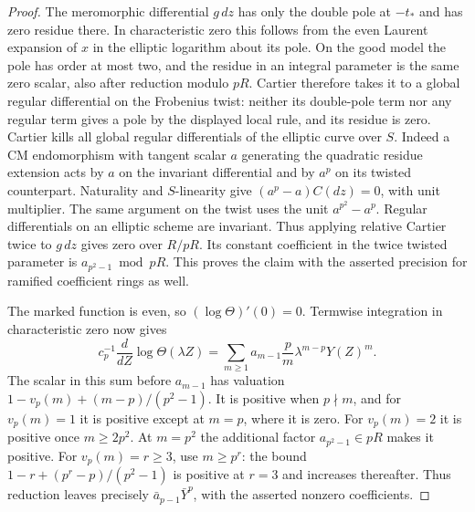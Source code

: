 \documentclass[a4paper,11pt]{article}
\theoremstyle{definition}
\theoremstyle{remark}
\numberwithin{equation}{section}
\begin{document}
\begin{proof}
The meromorphic differential \(g\,dz\) has only the double
pole at \(-t_*\) and has zero residue there. In characteristic
zero this follows from the even Laurent expansion of \(x\) in
the elliptic logarithm about its pole. On the good model the
pole has order at most two, and the residue in an integral
parameter is the same zero scalar, also after reduction
modulo \(pR\). Cartier therefore takes it to a global regular
differential on the Frobenius twist: neither its double-pole
term nor any regular term gives a pole by the displayed local
rule, and its residue is zero. Cartier kills all global regular
differentials of the elliptic curve over \(S\). Indeed a CM
endomorphism with tangent scalar \(a\) generating the quadratic
residue extension acts by \(a\) on the invariant differential
and by \(a^p\) on its twisted counterpart. Naturality and
\(S\)-linearity give \((a^p-a)C(dz)=0\), with unit multiplier.
The same argument on the twist uses the unit \(a^{p^2}-a^p\).
Regular differentials on an elliptic scheme are invariant.
Thus applying relative Cartier twice to \(g\,dz\) gives zero
over \(R/pR\). Its constant coefficient in the twice twisted
parameter is \(a_{p^2-1}\bmod pR\). This proves the claim with
the asserted precision for ramified coefficient rings as well.

The marked function is even, so \((\log\Theta)'(0)=0\).
Termwise integration in characteristic zero now gives
\[
 c_p^{-1}\frac{d}{dZ}\log\Theta(\lambda Z)
       =\sum_{m\ge1} a_{m-1}\frac{p}{m}\lambda^{m-p}Y(Z)^m .
\]
The scalar in this sum before \(a_{m-1}\) has valuation
\(1-v_p(m)+(m-p)/(p^2-1)\). It is positive when \(p\nmid m\),
and for \(v_p(m)=1\) it is positive except at \(m=p\), where
it is zero. For \(v_p(m)=2\) it is positive once \(m\ge2p^2\).
At \(m=p^2\) the additional factor \(a_{p^2-1}\in pR\)
makes it positive. For \(v_p(m)=r\ge3\), use \(m\ge p^r\):
the bound \(1-r+(p^r-p)/(p^2-1)\) is positive at \(r=3\)
and increases thereafter. Thus reduction leaves precisely
\(\bar a_{p-1}\bar Y^p\), with the asserted nonzero coefficients.
\end{proof}
\end{document}
